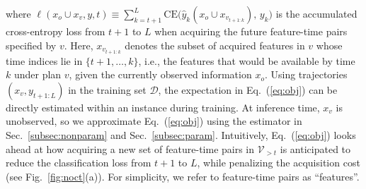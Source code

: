 
where $\ell (x_o \cup x_v, y, t) \equiv \sum_{k=t+1}^L \mathrm{CE}\bigl(\hat{y}_k({x}_{o} \cup {x}_{v_{t+1:k}}),\,y_{k}\bigr) $ is the accumulated cross-entropy loss from $t{+}1$ to $L$ when acquiring the future feature-time pairs specified by $v$. 
Here, $x_{v_{t+1:k}}$ denotes the subset of acquired features in $v$ whose time indices lie in $\{t{+}1,\ldots,k\}$, i.e., the features that would be available by time $k$ under plan $v$, given the currently observed information $x_o$. Using trajectories $(x_v, y_{t+1:L})$ in the training set $\mathcal{D}$, the expectation in Eq.~(\ref{eq:obj}) can be directly estimated within an instance during training. At inference time, $x_v$ is unobserved, so we approximate Eq.~(\ref{eq:obj}) using the estimator in Sec.~\ref{subsec:nonparam} and Sec.~\ref{subsec:param}. Intuitively, Eq.~(\ref{eq:obj}) looks ahead at how acquiring a new set of feature-time pairs in $\mathcal{V}_{>t}$ is anticipated to reduce the classification loss from $t+1$ to $L$, while penalizing the acquisition cost (see Fig.~\ref{fig:noct}(a)). For simplicity, we refer to feature-time pairs as ``features''.  %



